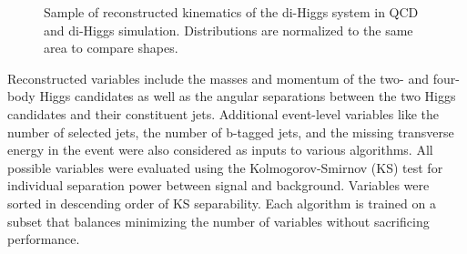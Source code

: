 \begin{figure}[ht!]
\begin{center}
  \caption{Sample of reconstructed kinematics of the di-Higgs system in QCD and di-Higgs simulation. Distributions are normalized to the same area to compare shapes.}
  \label{fig:recoInfo}
  \end{center}
\end{figure}


Reconstructed variables include the masses and momentum of the two- and four-body Higgs candidates as well as the angular separations between the two Higgs candidates and their constituent jets. Additional event-level variables like the number of selected jets, the number of b-tagged jets, and the missing transverse energy in the event were also considered as inputs to various algorithms. All possible variables were evaluated using the Kolmogorov-Smirnov (KS) test for individual separation power between signal and background. Variables were sorted in descending order of KS separability. Each algorithm is trained on a subset that balances minimizing the number of variables without sacrificing performance. 

